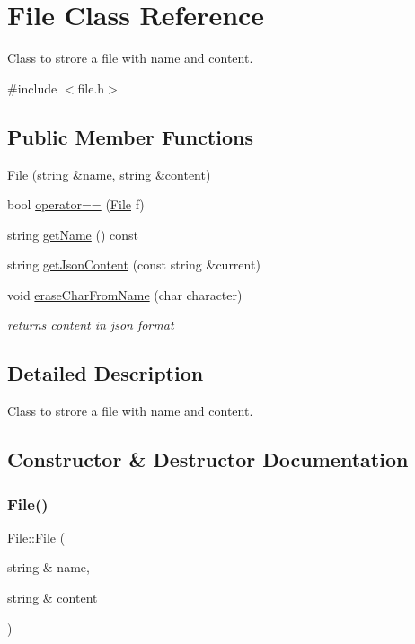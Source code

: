 \hypertarget{class_file}{}\section{File Class Reference}
\label{class_file}


Class to strore a file with name and content.  




{\ttfamily \#include $<$file.\+h$>$}

\subsection*{Public Member Functions}
\begin{DoxyCompactItemize}
\item 
\hyperlink{class_file_a87347ffc1d8cf9544036837353e37248}{File} (string \&name, string \&content)
\item 
bool \hyperlink{class_file_aadbe64432e7e403f546ff35a3bfa8d97}{operator==} (\hyperlink{class_file}{File} f)
\item 
string \hyperlink{class_file_a4b6032847dfd076db8ed44a532387f07}{get\+Name} () const
\item 
string \hyperlink{class_file_afaee512326a13dc99d6b8d08522eabe8}{get\+Json\+Content} (const string \&current)
\item 
void \hyperlink{class_file_aef2ef41308caf6124548ed6421b91188}{erase\+Char\+From\+Name} (char character)
\begin{DoxyCompactList}\small\item\em returns content in json format \end{DoxyCompactList}\end{DoxyCompactItemize}


\subsection{Detailed Description}
Class to strore a file with name and content. 

\subsection{Constructor \& Destructor Documentation}
\mbox{\label{class_file_a87347ffc1d8cf9544036837353e37248}} 
\subsubsection{\texorpdfstring{File()}{File()}}
{\footnotesize\ttfamily File\+::\+File (\begin{DoxyParamCaption}\item[{string \&}]{name,  }\item[{string \&}]{content }\end{DoxyParamCaption})\hspace{0.3cm}{\ttfamily [inline]}}



